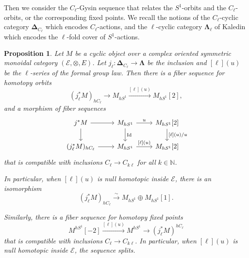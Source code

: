 \documentclass[11pt]{amsart}
\numberwithin{equation}{section}
\theoremstyle{plain}
\newtheorem{Prop}[prop]{Proposition}
\theoremstyle{definition}
\theoremstyle{remark}
\newcommand{\bN} { {\mathbb{N}}}
\newcommand{\cE} { {\mathcal{E}}}
\newcommand{\Id}{{\operatorname{Id}}}
\begin{document}
Then we consider the $C_\ell$-Gysin sequence that relates the $S^1$-orbits and the $C_\ell$-orbits, or the corresponding fixed points. We recall the notions of the $C_\ell$-cyclic category $\boldsymbol{\Delta}_{C_\ell}$ which encodes $C_\ell$-actions, and the $\ell$-cyclic category $\boldsymbol{\Lambda}_\ell$ of Kaledin which encodes the $\ell$-fold cover of $S^1$-actions.
\begin{Prop}\label{prop:Gysin-finite-group}
    Let $M$ be a cyclic object over a complex oriented symmetric monoidal category $(\cE, \otimes, E)$. Let $j_\ell: \boldsymbol{\Delta}_{C_\ell} \to \boldsymbol{\Lambda}$ be the inclusion and $[\ell](u)$ be the   $\ell$-series of the formal group law. Then there is a fiber sequence for homotopy orbits
    \[(j_\ell^*M)_{hC_\ell} \to M_{hS^1} \xrightarrow{[\ell](u)} M_{hS^1}[2],\]
    and a morphism of fiber sequences
    \begin{equation}\label{eq: diagram fiber sequence gysin}\begin{tikzcd}
    j^*M \arrow[r] \arrow[d]  & {M_{hS^1}} \arrow[d, "\Id"] \arrow[r, "u"]  & M_{hS^1}[2]  \arrow[d, "{[\ell](u)/u}"] \\
    (j_\ell^*M)_{hC_\ell} \arrow[r] & {M_{hS^1}} \arrow[r, "{[\ell](u)}"] & M_{hS^1}[2]
    \end{tikzcd}\end{equation}
    that is compatible with inclusions $C_\ell \rightarrow C_{k\ell}$ for all $k\in \bN$.

    In particular, when $[\ell](u)$ is null homotopic inside $\cE$, there is an isomorphism
    \[(j_\ell^*M)_{hC_\ell} \xrightarrow{\sim} M_{hS^1} \oplus M_{hS^1}[1] .\]

    Similarly, there is a fiber sequence for homotopy fixed points
    \[M^{hS^1}[-2] \xrightarrow{[\ell](u)} M^{hS^1} \to (j_\ell^*M)^{hC_\ell}\]
    that is compatible with inclusions $C_\ell \rightarrow C_{k\ell}$. In particular, when $[\ell](u)$ is null homotopic inside $\cE$, the sequence splits.
\end{Prop}
\end{document}
